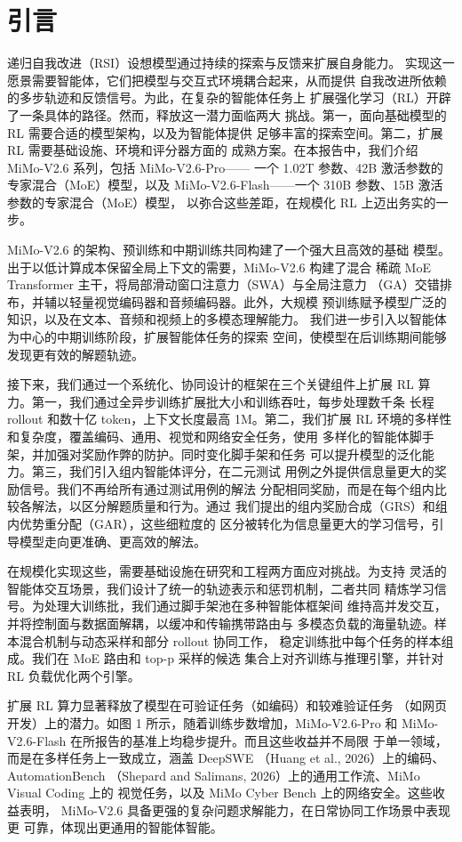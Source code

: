 \documentclass[
  10
]{article}
\begin{document}
\section{引言}\label{introduction}

递归自我改进（RSI）设想模型通过持续的探索与反馈来扩展自身能力。
实现这一愿景需要智能体，它们把模型与交互式环境耦合起来，从而提供
自我改进所依赖的多步轨迹和反馈信号。为此，在复杂的智能体任务上
扩展强化学习（RL）开辟了一条具体的路径。然而，释放这一潜力面临两大
挑战。第一，面向基础模型的 RL 需要合适的模型架构，以及为智能体提供
足够丰富的探索空间。第二，扩展 RL 需要基础设施、环境和评分器方面的
成熟方案。在本报告中，我们介绍 MiMo-V2.6 系列，包括 MiMo-V2.6-Pro——
一个 1.02T 参数、42B 激活参数的专家混合（MoE）模型，以及
MiMo-V2.6-Flash——一个 310B 参数、15B 激活参数的专家混合（MoE）模型，
以弥合这些差距，在规模化 RL 上迈出务实的一步。

MiMo-V2.6 的架构、预训练和中期训练共同构建了一个强大且高效的基础
模型。出于以低计算成本保留全局上下文的需要，MiMo-V2.6 构建了混合
稀疏 MoE Transformer 主干，将局部滑动窗口注意力（SWA）与全局注意力
（GA）交错排布，并辅以轻量视觉编码器和音频编码器。此外，大规模
预训练赋予模型广泛的知识，以及在文本、音频和视频上的多模态理解能力。
我们进一步引入以智能体为中心的中期训练阶段，扩展智能体任务的探索
空间，使模型在后训练期间能够发现更有效的解题轨迹。

接下来，我们通过一个系统化、协同设计的框架在三个关键组件上扩展 RL
算力。第一，我们通过全异步训练扩展批大小和训练吞吐，每步处理数千条
长程 rollout 和数十亿 token，上下文长度最高 1M。第二，我们扩展 RL
环境的多样性和复杂度，覆盖编码、通用、视觉和网络安全任务，使用
多样化的智能体脚手架，并加强对奖励作弊的防护。同时变化脚手架和任务
可以提升模型的泛化能力。第三，我们引入组内智能体评分，在二元测试
用例之外提供信息量更大的奖励信号。我们不再给所有通过测试用例的解法
分配相同奖励，而是在每个组内比较各解法，以区分解题质量和行为。通过
我们提出的组内奖励合成（GRS）和组内优势重分配（GAR），这些细粒度的
区分被转化为信息量更大的学习信号，引导模型走向更准确、更高效的解法。

在规模化实现这些，需要基础设施在研究和工程两方面应对挑战。为支持
灵活的智能体交互场景，我们设计了统一的轨迹表示和惩罚机制，二者共同
精炼学习信号。为处理大训练批，我们通过脚手架池在多种智能体框架间
维持高并发交互，并将控制面与数据面解耦，以缓冲和传输携带路由与
多模态负载的海量轨迹。样本混合机制与动态采样和部分 rollout 协同工作，
稳定训练批中每个任务的样本组成。我们在 MoE 路由和 top-p 采样的候选
集合上对齐训练与推理引擎，并针对 RL 负载优化两个引擎。

扩展 RL 算力显著释放了模型在可验证任务（如编码）和较难验证任务
（如网页开发）上的潜力。如图 1 所示，随着训练步数增加，MiMo-V2.6-Pro
和 MiMo-V2.6-Flash 在所报告的基准上均稳步提升。而且这些收益并不局限
于单一领域，而是在多样任务上一致成立，涵盖 DeepSWE
（Huang et al., 2026）上的编码、AutomationBench
（Shepard and Salimans, 2026）上的通用工作流、MiMo Visual Coding 上的
视觉任务，以及 MiMo Cyber Bench 上的网络安全。这些收益表明，
MiMo-V2.6 具备更强的复杂问题求解能力，在日常协同工作场景中表现更
可靠，体现出更通用的智能体智能。
\end{document}
